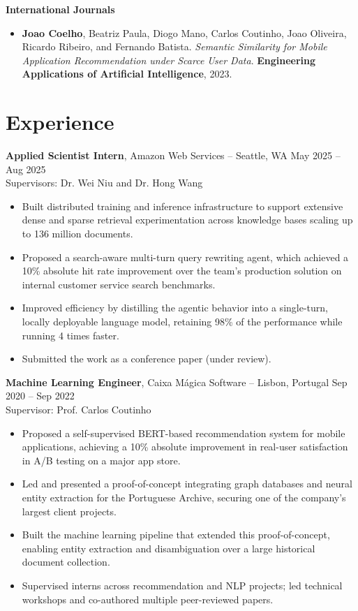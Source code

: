 \documentclass[11pt]{article}       %
\newcommand{\me}{\textbf{Joao Coelho}}
\newcommand{\keep}{\par\vspace{0pt plus 8\baselineskip}\penalty-200\vspace{0pt plus -8\baselineskip}}
\begin{document}
\textbf{International Journals}
\begin{itemize}
  \item \me, Beatriz Paula, Diogo Mano, Carlos Coutinho, Joao Oliveira, Ricardo Ribeiro, and Fernando Batista. \textit{Semantic Similarity for Mobile Application Recommendation under Scarce User Data}. \textbf{Engineering Applications of Artificial Intelligence}, 2023.
\end{itemize}


\keep
\section*{Experience}
\textbf{Applied Scientist Intern}, Amazon Web Services -- Seattle, WA \hfill May 2025 -- Aug 2025 \\
Supervisors: Dr. Wei Niu and Dr. Hong Wang
\begin{itemize}
  \item Built distributed training and inference infrastructure to support extensive dense and sparse retrieval experimentation across knowledge bases scaling up to 136 million documents.
  \item Proposed a search-aware multi-turn query rewriting agent, which achieved a 10\% absolute hit rate improvement over the team's production solution on internal customer service search benchmarks.
  \item Improved efficiency by distilling the agentic behavior into a single-turn, locally deployable language model, retaining 98\% of the performance while running 4 times faster.
  \item Submitted the work as a conference paper (under review).
\end{itemize}

\keep
\textbf{Machine Learning Engineer}, Caixa Mágica Software -- Lisbon, Portugal \hfill Sep 2020 -- Sep 2022 \\
Supervisor: Prof. Carlos Coutinho
\begin{itemize}
  \item Proposed a self-supervised BERT-based recommendation system for mobile applications, achieving a 10\% absolute improvement in real-user satisfaction in A/B testing on a major app store.
  \item Led and presented a proof-of-concept integrating graph databases and neural entity extraction for the Portuguese Archive, securing one of the company's largest client projects.
  \item Built the machine learning pipeline that extended this proof-of-concept, enabling entity extraction and disambiguation over a large historical document collection.
  \item Supervised interns across recommendation and NLP projects; led technical workshops and co-authored multiple peer-reviewed papers.
\end{itemize}
\end{document}
